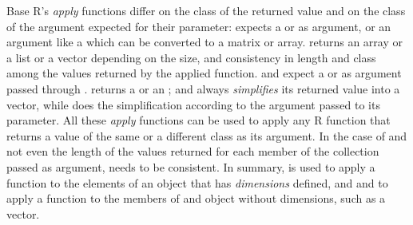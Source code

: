 \documentclass[krantz2,ChapterTOCs]{krantz}\usepackage{knitr}
\begin{document}
Base R's \emph{apply} functions differ on the class of the returned value and on the class of the argument expected for their  parameter:  expects a  or  as argument, or an argument like a  which can be converted to a matrix or array.  returns an array or a list or a vector depending on the size, and consistency in length and class among the values returned by the applied function.  and  expect a  or  as argument passed through .  returns a  or an ; and  always \emph{simplifies} its returned value into a vector, while  does the simplification according to the argument passed to its  parameter. All these \emph{apply} functions can be used to apply any R function that returns a value of the same or a different class as its argument. In the case of  and  not even the length of the values returned for each member of the collection passed as argument, needs to be consistent. In summary,  is used to apply a function to the elements of an object that has \emph{dimensions} defined, and  and  to apply a function to the members of and object without dimensions, such as a vector.
\end{document}
